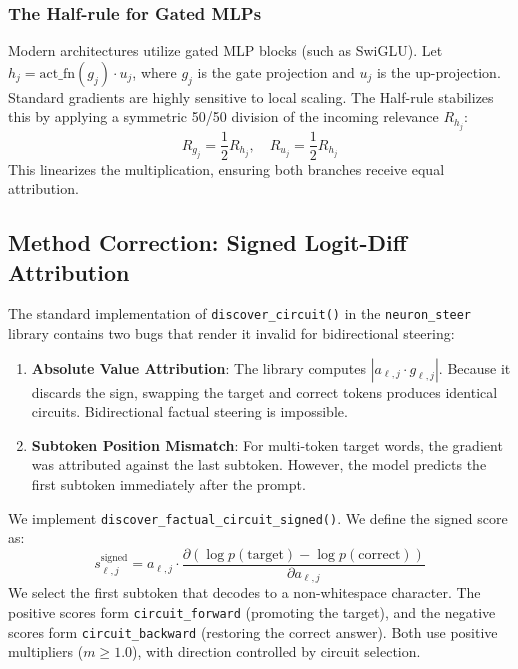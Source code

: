 \documentclass[11pt]{article}
\begin{document}
\subsubsection{The Half-rule for Gated MLPs}
Modern architectures utilize gated MLP blocks (such as SwiGLU). Let $h_j = \text{act\_fn}(g_j) \cdot u_j$, where $g_j$ is the gate projection and $u_j$ is the up-projection. Standard gradients are highly sensitive to local scaling. The Half-rule stabilizes this by applying a symmetric 50/50 division of the incoming relevance $R_{h_j}$:
\begin{equation}
R_{g_j} = \frac{1}{2} R_{h_j}, \quad R_{u_j} = \frac{1}{2} R_{h_j}
\end{equation}
This linearizes the multiplication, ensuring both branches receive equal attribution.

\subsection{Method Correction: Signed Logit-Diff Attribution}

The standard implementation of \texttt{discover\_circuit()} in the \texttt{neuron\_steer} library contains two bugs that render it invalid for bidirectional steering:
\begin{enumerate}
    \item \textbf{Absolute Value Attribution}: The library computes $|a_{\ell,j} \cdot g_{\ell,j}|$. Because it discards the sign, swapping the target and correct tokens produces identical circuits. Bidirectional factual steering is impossible.
    \item \textbf{Subtoken Position Mismatch}: For multi-token target words, the gradient was attributed against the last subtoken. However, the model predicts the first subtoken immediately after the prompt.
\end{enumerate}

We implement \texttt{discover\_factual\_circuit\_signed()}. We define the signed score as:
\begin{equation}
s_{\ell,j}^{\text{signed}} = a_{\ell,j} \cdot \frac{\partial (\log p(\text{target}) - \log p(\text{correct}))}{\partial a_{\ell,j}}
\end{equation}
We select the first subtoken that decodes to a non-whitespace character. The positive scores form \texttt{circuit\_forward} (promoting the target), and the negative scores form \texttt{circuit\_backward} (restoring the correct answer). Both use positive multipliers ($m \ge 1.0$), with direction controlled by circuit selection.
\end{document}

